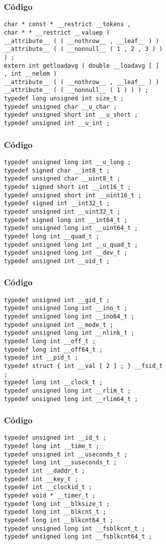 \documentclass{beamer}
\begin{document}
\begin{frame}[fragile]
\frametitle{C\'odigo}
\begin{verbatim}
char * const * __restrict __tokens , 
char * * __restrict __valuep ) 
__attribute__ ( ( __nothrow__ , __leaf__ ) ) 
__attribute__ ( ( __nonnull__ ( 1 , 2 , 3 ) ) 
) ; 
extern int getloadavg ( double __loadavg [ ] 
, int __nelem ) 
__attribute__ ( ( __nothrow__ , __leaf__ ) ) 
__attribute__ ( ( __nonnull__ ( 1 ) ) ) ; 
typedef long unsigned int size_t ; 
typedef unsigned char __u_char ; 
typedef unsigned short int __u_short ; 
typedef unsigned int __u_int ; 
\end{verbatim}
\end{frame}
\begin{frame}[fragile]
\frametitle{C\'odigo}
\begin{verbatim}
typedef unsigned long int __u_long ; 
typedef signed char __int8_t ; 
typedef unsigned char __uint8_t ; 
typedef signed short int __int16_t ; 
typedef unsigned short int __uint16_t ; 
typedef signed int __int32_t ; 
typedef unsigned int __uint32_t ; 
typedef signed long int __int64_t ; 
typedef unsigned long int __uint64_t ; 
typedef long int __quad_t ; 
typedef unsigned long int __u_quad_t ; 
typedef unsigned long int __dev_t ; 
typedef unsigned int __uid_t ; 
\end{verbatim}
\end{frame}
\begin{frame}[fragile]
\frametitle{C\'odigo}
\begin{verbatim}
typedef unsigned int __gid_t ; 
typedef unsigned long int __ino_t ; 
typedef unsigned long int __ino64_t ; 
typedef unsigned int __mode_t ; 
typedef unsigned long int __nlink_t ; 
typedef long int __off_t ; 
typedef long int __off64_t ; 
typedef int __pid_t ; 
typedef struct { int __val [ 2 ] ; } __fsid_t 
; 
typedef long int __clock_t ; 
typedef unsigned long int __rlim_t ; 
typedef unsigned long int __rlim64_t ; 
\end{verbatim}
\end{frame}
\begin{frame}[fragile]
\frametitle{C\'odigo}
\begin{verbatim}
typedef unsigned int __id_t ; 
typedef long int __time_t ; 
typedef unsigned int __useconds_t ; 
typedef long int __suseconds_t ; 
typedef int __daddr_t ; 
typedef int __key_t ; 
typedef int __clockid_t ; 
typedef void * __timer_t ; 
typedef long int __blksize_t ; 
typedef long int __blkcnt_t ; 
typedef long int __blkcnt64_t ; 
typedef unsigned long int __fsblkcnt_t ; 
typedef unsigned long int __fsblkcnt64_t ; 
\end{verbatim}
\end{frame}
\end{document}
